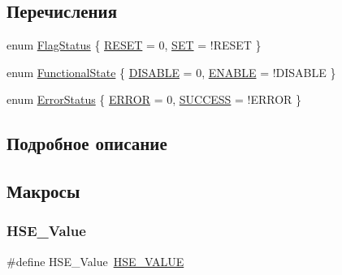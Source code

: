 \subsection*{Перечисления}
\begin{DoxyCompactItemize}
\item 
enum \mbox{\hyperlink{group___exported__types_ga89136caac2e14c55151f527ac02daaff}{Flag\+Status}} \{ \mbox{\hyperlink{group___exported__types_gga89136caac2e14c55151f527ac02daaffa589b7d94a3d91d145720e2fed0eb3a05}{R\+E\+S\+ET}} = 0, 
\mbox{\hyperlink{group___exported__types_gga89136caac2e14c55151f527ac02daaffab44c8101cc294c074709ec1b14211792}{S\+ET}} = !\+R\+E\+S\+ET
 \}
\item 
enum \mbox{\hyperlink{group___exported__types_gac9a7e9a35d2513ec15c3b537aaa4fba1}{Functional\+State}} \{ \mbox{\hyperlink{group___exported__types_ggac9a7e9a35d2513ec15c3b537aaa4fba1ad3a9df141be0ccf10389b640f492b26d}{D\+I\+S\+A\+B\+LE}} = 0, 
\mbox{\hyperlink{group___exported__types_ggac9a7e9a35d2513ec15c3b537aaa4fba1a7d46875fa3ebd2c34d2756950eda83bf}{E\+N\+A\+B\+LE}} = !\+D\+I\+S\+A\+B\+LE
 \}
\item 
enum \mbox{\hyperlink{group___exported__types_ga8333b96c67f83cba354b3407fcbb6ee8}{Error\+Status}} \{ \mbox{\hyperlink{group___exported__types_gga8333b96c67f83cba354b3407fcbb6ee8a2fd6f336d08340583bd620a7f5694c90}{E\+R\+R\+OR}} = 0, 
\mbox{\hyperlink{group___exported__types_gga8333b96c67f83cba354b3407fcbb6ee8ac7f69f7c9e5aea9b8f54cf02870e2bf8}{S\+U\+C\+C\+E\+SS}} = !\+E\+R\+R\+OR
 \}
\end{DoxyCompactItemize}


\subsection{Подробное описание}


\subsection{Макросы}
\mbox{\label{group___exported__types_gab12a1abe6dd0001e7a0487a8b175b28c}} 
\subsubsection{\texorpdfstring{HSE\_Value}{HSE\_Value}}
{\footnotesize\ttfamily \#define H\+S\+E\+\_\+\+Value~\mbox{\hyperlink{group___library__configuration__section_gaeafcff4f57440c60e64812dddd13e7cb}{H\+S\+E\+\_\+\+V\+A\+L\+UE}}}

